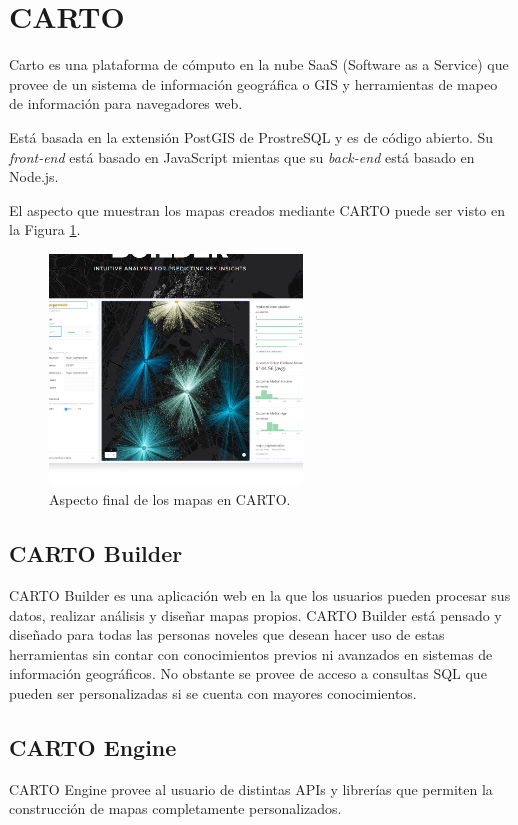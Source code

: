 \section{CARTO}
Carto \cite{carto:info} es una plataforma de cómputo en la nube SaaS (Software as a Service) que provee de un sistema de información geográfica o GIS y herramientas de mapeo de información para navegadores web.

Está basada en la extensión PostGIS de ProstreSQL y es de código abierto. Su \textit{front-end} está basado en JavaScript mientas que su \textit{back-end} está basado en Node.js.

El aspecto que muestran los mapas creados mediante CARTO puede ser visto en la Figura \ref{carto}.

\begin{figure}[h]
  \centering
    \includegraphics[width=0.6\textwidth]{../img/weka/carto.jpg}
  \caption{Aspecto final de los mapas en CARTO.}
  \label{carto}
\end{figure}


\subsection{CARTO Builder}
CARTO Builder es una aplicación web en la que los usuarios pueden procesar sus datos, realizar análisis y diseñar mapas propios. CARTO Builder está pensado y diseñado para todas las personas noveles que desean hacer uso de estas herramientas sin contar con conocimientos previos ni avanzados en sistemas de información geográficos. No obstante se provee de acceso a consultas SQL que pueden ser personalizadas si se cuenta con mayores conocimientos.

\subsection{CARTO Engine}
CARTO Engine provee al usuario de distintas APIs y librerías que permiten la construcción de mapas completamente personalizados.

